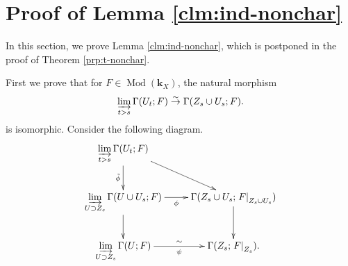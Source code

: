 ﻿\documentclass[a4paper,leqno,dvipdfmx]{jsarticle}
\makeatletter
\theoremstyle{definition}
\newcommand{\kk}{\mathbf{k}}
\newcommand{\Mod}{\mathop{\mathrm{Mod}}\nolimits}
\renewenvironment{proof}[1][\proofname]{\par
  \pushQED{\qed}%
  \normalfont \topsep6\p@\@plus6\p@\relax
  \trivlist
  \item[\hskip\labelsep
         \bfseries
    {#1}]\ignorespaces
}{%
  \popQED\endtrivlist\@endpefalse
}
\renewcommand{\proofname}{Proof.}
\numberwithin{equation}{section}
\newcommand{\simar}{\mathrel{\overset{\sim}{\rightarrow}}}%
\newcommand{\indlim}[1][]{\mathop{\varinjlim}\limits_{#1}}
\newcommand{\mres}[2][]{{\left.{#1}\right\rvert}_{#2}}
\theoremstyle{mystyle}
\makeatother
\begin{document}
\section{Proof of Lemma {\ref{clm:ind-nonchar}}}\label{sec:proof-lem}

In this section, 
we prove Lemma \ref{clm:ind-nonchar}, 
which is postponed in the proof of Theorem \ref{prp:t-nonchar}. 

\begin{proof}[Proof of Lemma \ref{clm:ind-nonchar}]
  First we prove that 
  for \(F\in \Mod(\kk_X)\), 
  the natural morphism
  \begin{equation}\label{eq:qis-claim}
    \indlim[t>s]\Gamma(U_t;F)
    \simar 
    \Gamma(Z_{s}\cup U_{s};F).
  \end{equation}
  is isomorphic. 
  Consider the following diagram. 
  \[\vcenter{\xymatrix{
    \indlim[t>s]\Gamma(U_t;F)
    \ar[rd]
    \ar[d]_-{\tilde{\phi}}
    &
    \\
    \indlim[U\supset Z_{s}]
    \Gamma(U\cup U_{s};F)
    \ar[d]
    \ar[r]_-{\phi}
    &
    \Gamma(Z_{s}\cup U_{s};\mres[F]{Z_{s}\cup U_{s}})
    \ar[d]
    \\
    \indlim[U\supset Z_{s}]
    \Gamma(U;F)
    \ar[r]_-{\psi}^-{\sim}
    &
    \Gamma(Z_{s};\mres[F]{Z_{s}})\textcolor{black}{.}
  }}
  \] 
  

\end{proof}
\end{document}

